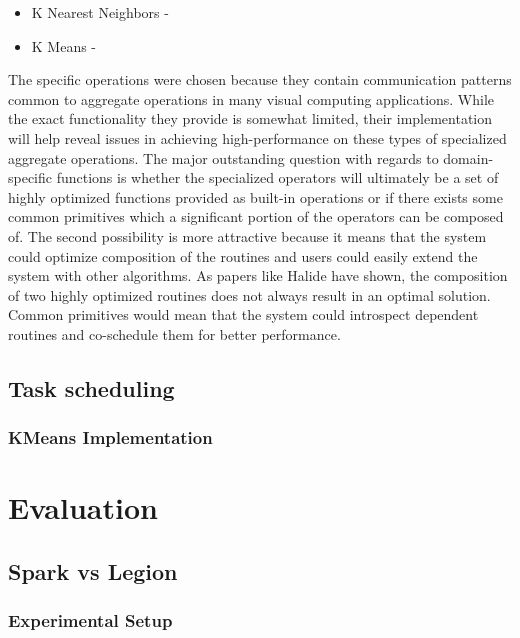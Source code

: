 \documentclass[tog]{acmsiggraph}
\begin{document}
\begin{itemize}
\item K Nearest Neighbors - 
\item K Means - 
\end{itemize}

The specific operations were chosen because they contain communication patterns
common to aggregate operations in many visual computing applications. While the
exact functionality they provide is somewhat limited, their implementation will
help reveal issues in achieving high-performance on these types of specialized
aggregate operations. The major outstanding question with regards to
domain-specific functions is whether the specialized operators will ultimately
be a set of highly optimized functions provided as built-in operations or if
there exists some common primitives which a significant portion of the
operators can be composed of. The second possibility is more attractive because
it means that the system could optimize composition of the routines and users
could easily extend the system with other algorithms. As papers like Halide
have shown, the composition of two highly optimized routines does not always
result in an optimal solution. Common primitives would mean that the system
could introspect dependent routines and co-schedule them for better
performance.



\subsection{Task scheduling}

\subsubsection{KMeans Implementation}

\section{Evaluation}

\subsection{Spark vs Legion}

\subsubsection{Experimental Setup}
\end{document}
